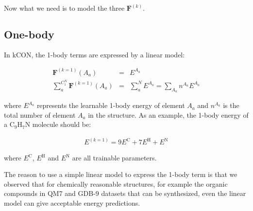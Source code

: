 \noindent Now what we need is to model the three $\mathbf{F}^{(k)}$.

\subsection{One-body}

In kCON, the 1-body terms are expressed by a linear model:

\begin{eqnarray}
\mathbf{F}^{(k=1)}(A_a) 
& = & 
E^{A_a} \\
\sum_{a}^{C^N_1}{\mathbf{F}^{(k=1)}(A_a)} 
& = & 
\sum_{a}^{N}{E^{A_a}} = \sum_{A_{a}}{n^{A_a}E^{A_a}}
\end{eqnarray}

\noindent where $E^{A_a}$ represents the learnable 1-body energy of element $A_a$ and 
$n^{A_a}$ is the total number of element $A_a$ in the structure. As an example, the 1-body 
energy of a $\mathrm{C}_9 \mathrm{H}_7 \mathrm{N}$ molecule should be:

\begin{eqnarray}
E^{(k=1)} = 9E^{\mathrm{C}} + 7E^{\mathrm{H}} + E^{\mathrm{N}}
\end{eqnarray}

\noindent where $E^{\mathrm{C}}$, $E^{\mathrm{H}}$ and $E^{\mathrm{N}}$ are all trainable 
parameters.

The reason to use a simple linear model to express the 1-body term is that we observed that for 
chemically reasonable structures, for example the organic compounds in QM7 and GDB-9 datasets 
that can be synthesized, even the linear model can give acceptable energy predictions.

\begin{center}
\end{center}

